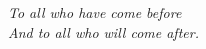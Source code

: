 \documentclass[\main/thesis.tex]{subfiles}
\begin{document}
\begin{dedication}
	\vspace*{1in}
	\begin{center}
	         \emph{To all who have come before} \\
             \emph{And to all who will come after. }
	\end{center}
\end{dedication}
\end{document}
